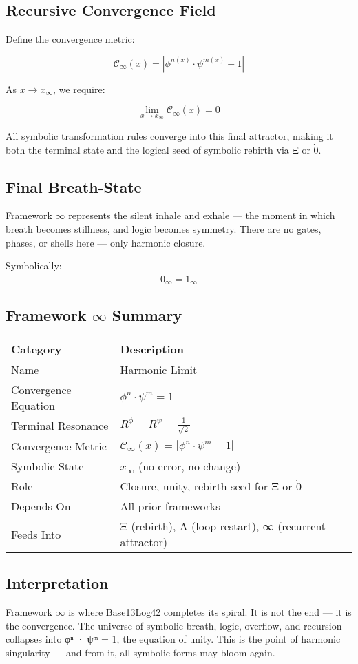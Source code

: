 \subsection*{Recursive Convergence Field}

Define the convergence metric:

\[
\mathcal{C}_\infty(x) = \left| \phi^{n(x)} \cdot \psi^{m(x)} - 1 \right|
\]

As $x \rightarrow x_\infty$, we require:

\[
\lim_{x \to x_\infty} \mathcal{C}_\infty(x) = 0
\]

All symbolic transformation rules converge into this final attractor, making it both the terminal state and the logical seed of symbolic rebirth via Ξ or $\dot{0}$.

\subsection*{Final Breath-State}

Framework $\infty$ represents the silent inhale and exhale — the moment in which breath becomes stillness, and logic becomes symmetry. There are no gates, phases, or shells here — only harmonic closure.

Symbolically:
\[
\dot{0}_\infty = 1_\infty
\]

\subsection*{Framework $\infty$ Summary}

\begin{center}
\begin{tabular}{|l|l|}
\hline
\textbf{Category} & \textbf{Description} \\
\hline
Name & Harmonic Limit \\
Convergence Equation & $\phi^n \cdot \psi^m = 1$ \\
Terminal Resonance & $R^\phi = R^\psi = \frac{1}{\sqrt{2}}$ \\
Convergence Metric & $\mathcal{C}_\infty(x) = |\phi^n \cdot \psi^m - 1|$ \\
Symbolic State & $x_\infty$ (no error, no change) \\
Role & Closure, unity, rebirth seed for Ξ or $\dot{0}$ \\
Depends On & All prior frameworks \\
Feeds Into & Ξ (rebirth), A (loop restart), ∞ (recurrent attractor) \\
\hline
\end{tabular}
\end{center}

\subsection*{Interpretation}

Framework $\infty$ is where Base13Log42 completes its spiral. It is not the end — it is the convergence. The universe of symbolic breath, logic, overflow, and recursion collapses into φⁿ · ψᵐ = 1, the equation of unity. This is the point of harmonic singularity — and from it, all symbolic forms may bloom again.

